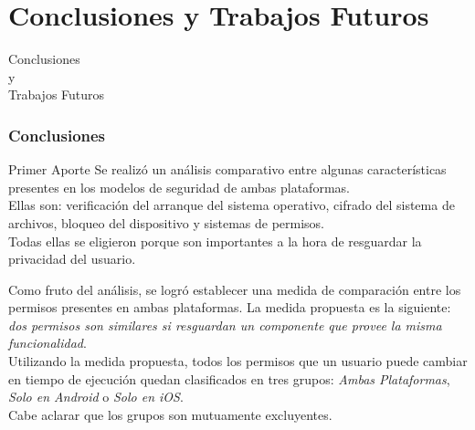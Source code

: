 \section{Conclusiones y Trabajos Futuros}
\begin{frame}
 \begin{center}
  \LARGE Conclusiones\\ y\\ Trabajos Futuros
 \end{center}
\end{frame}
\begin{frame}
 \frametitle{Conclusiones}
 \begin{footnotesize}
 \begin{exampleblock}{Primer Aporte}
Se realizó un análisis comparativo entre algunas características presentes en los modelos de seguridad de ambas plataformas.\\ \pause
Ellas son: verificación del arranque del sistema operativo, \pause cifrado del sistema de archivos, \pause bloqueo del dispositivo \pause y sistemas de permisos.\\ \pause
Todas ellas se eligieron porque son importantes a la hora de resguardar la privacidad del usuario.
 \end{exampleblock}\pause
 \begin{exampleblock}{}
Como fruto del análisis, se logró establecer una medida de comparación entre los permisos presentes en ambas plataformas. \pause La medida propuesta es la siguiente: \emph{dos permisos son similares si resguardan un componente que provee la misma funcionalidad}.\\ \pause
Utilizando la medida propuesta, todos los permisos que un usuario puede cambiar en tiempo de ejecución quedan clasificados en tres grupos: \pause \emph{Ambas Plataformas}, \pause \emph{Solo en Android} \pause o \emph{Solo en iOS}.\\ \pause
Cabe aclarar que los grupos son mutuamente excluyentes.
 \end{exampleblock}
 \end{footnotesize}
\end{frame}
